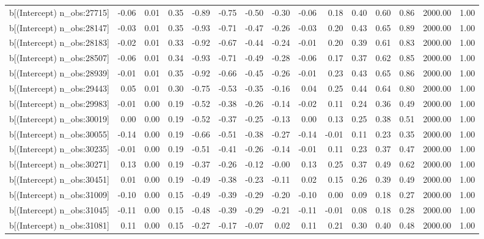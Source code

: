 \begin{table}[ht]
\begin{tabular}{rrrrrrrrrrrrrrr}
  b[(Intercept) n\_obs:27715] & -0.06 & 0.01 & 0.35 & -0.89 & -0.75 & -0.50 & -0.30 & -0.06 & 0.18 & 0.40 & 0.60 & 0.86 & 2000.00 & 1.00 \\ 
  b[(Intercept) n\_obs:28147] & -0.03 & 0.01 & 0.35 & -0.93 & -0.71 & -0.47 & -0.26 & -0.03 & 0.20 & 0.43 & 0.65 & 0.89 & 2000.00 & 1.00 \\ 
  b[(Intercept) n\_obs:28183] & -0.02 & 0.01 & 0.33 & -0.92 & -0.67 & -0.44 & -0.24 & -0.01 & 0.20 & 0.39 & 0.61 & 0.83 & 2000.00 & 1.00 \\ 
  b[(Intercept) n\_obs:28507] & -0.06 & 0.01 & 0.34 & -0.93 & -0.71 & -0.49 & -0.28 & -0.06 & 0.17 & 0.37 & 0.62 & 0.85 & 2000.00 & 1.00 \\ 
  b[(Intercept) n\_obs:28939] & -0.01 & 0.01 & 0.35 & -0.92 & -0.66 & -0.45 & -0.26 & -0.01 & 0.23 & 0.43 & 0.65 & 0.86 & 2000.00 & 1.00 \\ 
  b[(Intercept) n\_obs:29443] & 0.05 & 0.01 & 0.30 & -0.75 & -0.53 & -0.35 & -0.16 & 0.04 & 0.25 & 0.44 & 0.64 & 0.80 & 2000.00 & 1.00 \\ 
  b[(Intercept) n\_obs:29983] & -0.01 & 0.00 & 0.19 & -0.52 & -0.38 & -0.26 & -0.14 & -0.02 & 0.11 & 0.24 & 0.36 & 0.49 & 2000.00 & 1.00 \\ 
  b[(Intercept) n\_obs:30019] & 0.00 & 0.00 & 0.19 & -0.52 & -0.37 & -0.25 & -0.13 & 0.00 & 0.13 & 0.25 & 0.38 & 0.51 & 2000.00 & 1.00 \\ 
  b[(Intercept) n\_obs:30055] & -0.14 & 0.00 & 0.19 & -0.66 & -0.51 & -0.38 & -0.27 & -0.14 & -0.01 & 0.11 & 0.23 & 0.35 & 2000.00 & 1.00 \\ 
  b[(Intercept) n\_obs:30235] & -0.01 & 0.00 & 0.19 & -0.51 & -0.41 & -0.26 & -0.14 & -0.01 & 0.11 & 0.23 & 0.37 & 0.47 & 2000.00 & 1.00 \\ 
  b[(Intercept) n\_obs:30271] & 0.13 & 0.00 & 0.19 & -0.37 & -0.26 & -0.12 & -0.00 & 0.13 & 0.25 & 0.37 & 0.49 & 0.62 & 2000.00 & 1.00 \\ 
  b[(Intercept) n\_obs:30451] & 0.01 & 0.00 & 0.19 & -0.49 & -0.38 & -0.23 & -0.11 & 0.02 & 0.15 & 0.26 & 0.39 & 0.49 & 2000.00 & 1.00 \\ 
  b[(Intercept) n\_obs:31009] & -0.10 & 0.00 & 0.15 & -0.49 & -0.39 & -0.29 & -0.20 & -0.10 & 0.00 & 0.09 & 0.18 & 0.27 & 2000.00 & 1.00 \\ 
  b[(Intercept) n\_obs:31045] & -0.11 & 0.00 & 0.15 & -0.48 & -0.39 & -0.29 & -0.21 & -0.11 & -0.01 & 0.08 & 0.18 & 0.28 & 2000.00 & 1.00 \\ 
  b[(Intercept) n\_obs:31081] & 0.11 & 0.00 & 0.15 & -0.27 & -0.17 & -0.07 & 0.02 & 0.11 & 0.21 & 0.30 & 0.40 & 0.48 & 2000.00 & 1.00 \\ 

\end{tabular}
\end{table}
